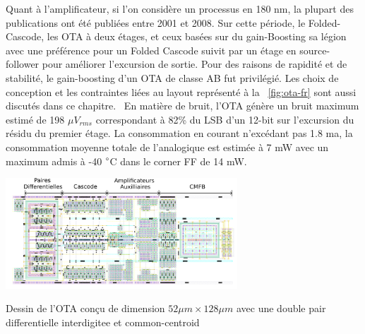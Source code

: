 \begin{mdframed}[linecolor=Prune,linewidth=1]
Quant à l'amplificateur, si l'on considère un processus en 180 nm, la plupart des publications ont été publiées entre 2001 et 2008. Sur cette période, le Folded-Cascode, les OTA à deux étages, et ceux basées sur du gain-Boosting sa légion avec une préférence pour un Folded Cascode suivit par un étage en source-follower pour améliorer l'excursion de sortie. Pour des raisons de rapidité et de stabilité, le gain-boosting d'un OTA de classe AB fut privilégié. Les choix de conception et les contraintes liées au layout représenté à la \figurename~\ref{fig:ota-fr} sont aussi discutés dans ce chapitre.  En matière de bruit, l'OTA génère un bruit maximum estimé de 198 \(\mu V _{rms} \) correspondant à 82\% du LSB d'un 12-bit sur l'excursion du résidu du premier étage. La consommation en courant n'excédant pas 1.8 ma, la consommation moyenne totale de l'analogique est estimée à 7 mW avec un maximum admis à -40 $\degree$C dans le corner FF de 14 mW.

\begin{center}
    \centering
    \includegraphics[width=0.65\textwidth]{Chapter7/Figs/layout_ota_v2-fr.png}
    \caption[]{Dessin de l'OTA conçu de dimension \(52 \mu m \times 128 \mu m\) avec une double pair differentielle interdigitee et common-centroid}
    \label{fig:ota-fr}
\end{center}


\end{mdframed}
